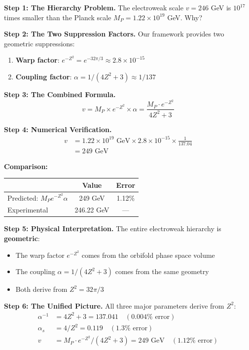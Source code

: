 \documentclass[12pt,a4paper]{article}
\newcommand{\Zsq}{Z^2}
\begin{document}
\textbf{Step 1: The Hierarchy Problem.}
The electroweak scale $v = 246$ GeV is $10^{17}$ times smaller than the Planck scale $M_P = 1.22 \times 10^{19}$ GeV. Why?

\textbf{Step 2: The Two Suppression Factors.}
Our framework provides two geometric suppressions:
\begin{enumerate}[itemsep=0pt]
    \item \textbf{Warp factor}: $e^{-\Zsq} = e^{-32\pi/3} \approx 2.8 \times 10^{-15}$
    \item \textbf{Coupling factor}: $\alpha = 1/(4\Zsq + 3) \approx 1/137$
\end{enumerate}

\textbf{Step 3: The Combined Formula.}
\begin{equation}
\boxed{v = M_P \times e^{-\Zsq} \times \alpha = \frac{M_P \cdot e^{-\Zsq}}{4\Zsq + 3}}
\end{equation}

\textbf{Step 4: Numerical Verification.}
\begin{align}
v &= 1.22 \times 10^{19} \text{ GeV} \times 2.8 \times 10^{-15} \times \frac{1}{137.04} \\
&= 249 \text{ GeV}
\end{align}

\textbf{Comparison:}
\begin{center}
\begin{tabular}{lcc}
\toprule
& Value & Error \\
\midrule
Predicted: $M_P e^{-\Zsq} \alpha$ & 249 GeV & 1.12\% \\
Experimental & 246.22 GeV & --- \\
\bottomrule
\end{tabular}
\end{center}

\textbf{Step 5: Physical Interpretation.}
The entire electroweak hierarchy is \textbf{geometric}:
\begin{itemize}[itemsep=0pt]
    \item The warp factor $e^{-\Zsq}$ comes from the orbifold phase space volume
    \item The coupling $\alpha = 1/(4\Zsq + 3)$ comes from the same geometry
    \item Both derive from $\Zsq = 32\pi/3$
\end{itemize}

\textbf{Step 6: The Unified Picture.}
All three major parameters derive from $\Zsq$:
\begin{align}
\alpha^{-1} &= 4\Zsq + 3 = 137.041 \quad (0.004\% \text{ error}) \\
\alpha_s &= 4/\Zsq = 0.119 \quad (1.3\% \text{ error}) \\
v &= M_P \cdot e^{-\Zsq}/(4\Zsq + 3) = 249 \text{ GeV} \quad (1.12\% \text{ error})
\end{align}
\end{document}
